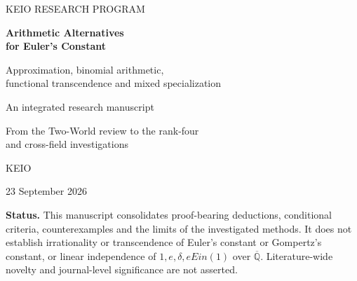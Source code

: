 \documentclass[11pt,a4paper]{article}
\theoremstyle{definition}
\theoremstyle{remark}
\theoremstyle{plain}
\numberwithin{equation}{section}
\def\operatorname#1{#1}\def\mathrm#1{#1}}
\begin{document}
\begin{titlepage}
\centering
\vspace*{18mm}
{\small\sffamily KEIO RESEARCH PROGRAM\par}
\vspace{12mm}
{\Huge\bfseries Arithmetic Alternatives\\[5pt] for Euler's Constant\par}
\vspace{9mm}
{\Large Approximation, binomial arithmetic,\\[4pt]
functional transcendence and mixed specialization\par}
\vspace{12mm}
{\large An integrated research manuscript\par}
\vspace{3mm}
{\normalsize From the Two-World review to the rank-four\\
and cross-field investigations\par}
\vspace{14mm}
{\Large KEIO\par}
\vspace{4mm}
{23 September 2026\par}
\vfill
\begin{minipage}{0.87\textwidth}
\small
\textbf{Status.} This manuscript consolidates proof-bearing deductions,
conditional criteria, counterexamples and the limits of the investigated
methods. It does not establish irrationality or transcendence of Euler's
constant or Gompertz's constant, or linear independence of
$1,e,\delta,e\operatorname{Ein}(1)$ over $\overline{\mathbb Q}$.
Literature-wide novelty and journal-level significance are not asserted.
\end{minipage}
\vspace{10mm}
\end{titlepage}
\end{document}
